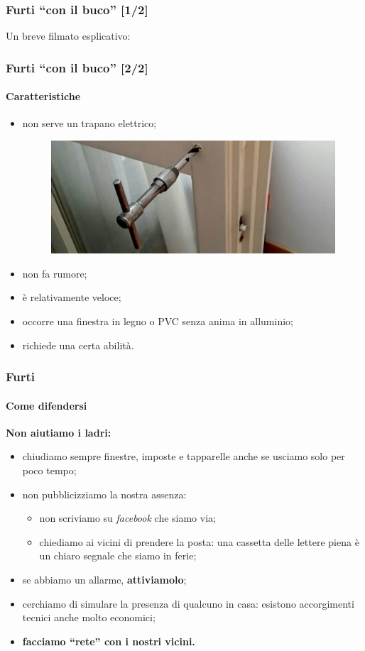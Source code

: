 \documentclass[11pt]{beamer}
\begin{document}
	\begin{frame}
		\frametitle{Furti ``con il buco'' [1/2]}
		Un breve filmato esplicativo:
		\begin{center}%
		\end{center}
	\end{frame}
		
	\begin{frame}
		\frametitle{Furti ``con il buco'' [2/2]}
		\framesubtitle{Caratteristiche}
		\begin{itemize}
			\item non serve un trapano elettrico;
			\begin{figure}
				\centering
				\includegraphics[width=0.7\linewidth]{"pics/trapano a mano"}
			\end{figure}
			\item non fa rumore;
			\item è relativamente veloce;
			\item occorre una finestra in legno o PVC senza anima in alluminio;
			\item richiede una certa abilità.
		\end{itemize}		
	\end{frame}
	
	\begin{frame}
		\frametitle{Furti}
		\framesubtitle{Come difendersi}
		\textbf{Non aiutiamo i ladri:} 
		\begin{itemize}
			\item chiudiamo sempre finestre, imposte e tapparelle anche
			se usciamo solo per poco tempo;
			\item non pubblicizziamo la nostra assenza:
			\begin{itemize}
				\item non scriviamo su \textit{facebook} che siamo via;
				\item chiediamo ai vicini di prendere la posta: una cassetta delle lettere piena è un chiaro segnale che siamo in ferie;
			\end{itemize}
			\item se abbiamo un allarme, \textbf{attiviamolo};
			\item cerchiamo di simulare la presenza di qualcuno in casa: esistono accorgimenti tecnici anche molto economici;
			\item \textbf{facciamo ``rete'' con i nostri vicini.}
		\end{itemize}

		
	\end{frame}
	
\end{document}
